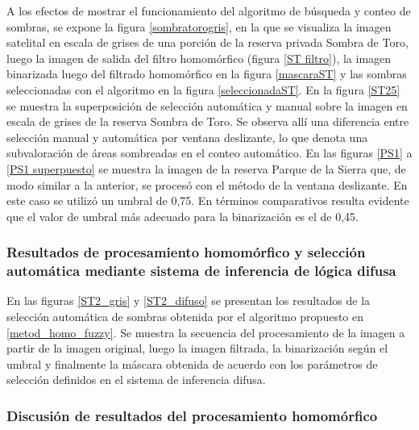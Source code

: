 A los efectos de mostrar el funcionamiento del algoritmo de búsqueda y conteo de sombras, se expone la figura \ref{sombratorogris}, en la que se visualiza la imagen satelital en escala de grises de una porción de la reserva privada Sombra de Toro, luego la imagen de salida del filtro homomórfico (figura \ref{ST filtro}), la imagen binarizada luego del filtrado homomórfico en la figura \ref{mascaraST} y las sombras seleccionadas con el algoritmo en la figura \ref{seleccionadaST}. En la figura \ref{ST25} se muestra la superposición de selección automática y manual sobre la imagen en escala de grises de la reserva Sombra de Toro. Se observa allí una diferencia entre selección manual y automática por ventana deslizante, lo que denota una subvaloración de áreas sombreadas en el conteo automático.
En las figuras \ref{PS1} a \ref{PS1 superpuesto} se muestra la imagen de la reserva Parque de la Sierra que, de modo similar a la anterior, se procesó con el método de la ventana deslizante. En este caso se utilizó un umbral de 0,75. En términos comparativos resulta evidente que el valor de umbral más adecuado para la binarización es el de 0,45.

\subsubsection{Resultados de procesamiento homomórfico y selección automática mediante sistema de inferencia de lógica difusa} \label{resultados homo difusa}
En las figuras \ref{ST2_gris} y \ref{ST2_difuso} se presentan los resultados de la selección automática de sombras obtenida por el algoritmo propuesto en \ref{metod_homo_fuzzy}.
Se muestra la secuencia del procesamiento de la imagen a partir de la imagen original, luego la imagen filtrada, la binarización según el umbral y finalmente la máscara obtenida de acuerdo con los parámetros de selección definidos en el sistema de inferencia difusa.



\subsubsection{Discusión de resultados del procesamiento homomórfico}

